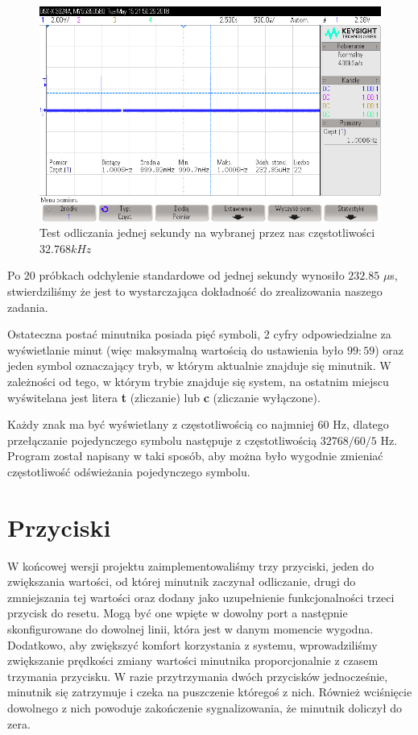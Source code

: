 \documentclass[fleqn]{article}
\begin{document}
\begin{figure}[H]
	\includegraphics[width=\textwidth]{scope_1.png}
	\caption{Test odliczania jednej sekundy na wybranej przez nas częstotliwości $32.768 kHz$}
\end{figure}

Po 20 próbkach odchylenie standardowe od jednej sekundy wynosiło $232.85$ $\mu$s, stwierdziliśmy że jest to wystarczająca dokładność do zrealizowania naszego zadania.

Ostateczna postać minutnika posiada pięć symboli, 2 cyfry odpowiedzialne za wyświetlanie minut (więc maksymalną wartością do ustawienia było $99:59$) oraz jeden symbol oznaczający tryb, w którym aktualnie znajduje się minutnik. W zależności od tego, w którym trybie znajduje się system, na ostatnim miejscu wyświtelana jest litera \textbf{t} (zliczanie) lub \textbf {c} (zliczanie wyłączone).

Każdy znak ma być wyświetlany z częstotliwością co najmniej $60$ Hz, dlatego przełączanie pojedynczego symbolu następuje z częstotliwością $32768 / 60 / 5$ Hz. Program został napisany w taki sposób, aby można było wygodnie zmieniać częstotliwość odświeżania pojedynczego symbolu.

\section{Przyciski}

W końcowej wersji projektu zaimplementowaliśmy trzy przyciski, jeden do zwiększania wartości, od której minutnik zaczynał odliczanie, drugi do zmniejszania tej wartości oraz dodany jako uzupełnienie funkcjonalności trzeci przycisk do resetu. Mogą być one wpięte w dowolny port a następnie skonfigurowane do dowolnej linii, która jest w danym momencie wygodna. Dodatkowo, aby zwiększyć komfort korzystania z systemu, wprowadziliśmy zwiększanie prędkości zmiany wartości minutnika proporcjonalnie z czasem trzymania przycisku. W razie przytrzymania dwóch przycisków jednocześnie, minutnik się zatrzymuje i czeka na puszczenie któregoś z nich. Również wciśnięcie dowolnego z nich powoduje zakończenie sygnalizowania, że minutnik doliczył do zera.
\end{document}
